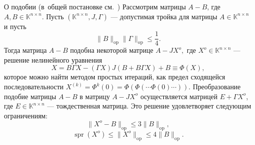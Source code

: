 \begin{ksvthm*}{О подобии (в~общей постановке см.~\cite{baskakov-harmonic,baskakov1983})}
    Рассмотрим матрицы \( A-B \),
        где \( A,B\in \mathbb{K}^{n{\times}n} \).
    Пусть \( (\mathbb{K}^{n\times n}, J, \Gamma) \)
        --- допустимая тройка для матрицы \( A\in\mathbb{K}^{n{\times}n} \)
        и пусть
    \[
        \|B\|_{\mathrm{op}} \|\Gamma\|_{\mathrm{op}} \leq \frac14.
        \]
    Тогда матрица \( A-B \)
        подобна некоторой матрице \( A - J X^o, \)
        где \( X^o\in\mathbb{K}^{n{\times}n} \)
        --- решение нелинейного уравнения
    \[
        X = B\Gamma X - (\Gamma X)J(B + B\Gamma X) + B \equiv \Phi(X),
        \]
        которое можно найти методом простых итераций,
        как предел сходящейся последовательности
        \( X^{(k)} = \Phi^{k}(0) = \Phi(\Phi(\cdots\Phi(0)\cdots)) \).
    Преобразование подобие матрицы \( A-B \)
        в матрицу \( A-JX^o \) осуществляется
        матрицей \( E+\Gamma X^o \),
        где \( E\in\mathbb{K}^{n{\times}n} \) --- тождественная матрица.
    Это решение удовлетворяет следующим ограничениям:
    \[ \|X^o - B\|_{\mathrm{op}} \leq 3\|B\|_{\mathrm{op}}, \]
    \[ \operatorname{spr}(X^o) \leq \|X^o\|_{\mathrm{op}} \leq 4\|B\|_{\mathrm{op}}. \]
\end{ksvthm*}

